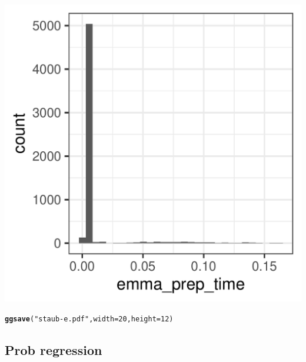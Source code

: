 \documentclass{article}\usepackage[]{graphicx}\usepackage[]{color}
\makeatletter
\def\maxwidth{ %
  \ifdim\Gin@nat@width>\linewidth
    \linewidth
  \else
    \Gin@nat@width
  \fi
}
\newcommand{\hlnum}[1]{\textcolor[rgb]{0.686,0.059,0.569}{#1}}%
\newcommand{\hlstr}[1]{\textcolor[rgb]{0.192,0.494,0.8}{#1}}%
\newcommand{\hlstd}[1]{\textcolor[rgb]{0.345,0.345,0.345}{#1}}%
\newcommand{\hlkwc}[1]{\textcolor[rgb]{0.333,0.667,0.333}{#1}}%
\newcommand{\hlkwd}[1]{\textcolor[rgb]{0.737,0.353,0.396}{\textbf{#1}}}%
\newenvironment{kframe}{%
 \def\at@end@of@kframe{}%
 \ifinner\ifhmode%
  \def\at@end@of@kframe{\end{minipage}}%
  \begin{minipage}{\columnwidth}%
 \fi\fi%
 \def\FrameCommand##1{\hskip\@totalleftmargin \hskip-\fboxsep
 \colorbox{shadecolor}{##1}\hskip-\fboxsep
     \hskip-\linewidth \hskip-\@totalleftmargin \hskip\columnwidth}%
 \MakeFramed {\advance\hsize-\width
   \@totalleftmargin\z@ \linewidth\hsize
   \@setminipage}}%
 {\par\unskip\endMakeFramed%
 \at@end@of@kframe}
\newenvironment{knitrout}{}{} %
\makeatother
\begin{document}
\begin{knitrout}
\begin{kframe}
{\ttfamily\noindent\itshape\color{messagecolor}{\#\# `stat\_bin()` using `bins = 30`. Pick better value with `binwidth`.}}\end{kframe}
\includegraphics[width=\maxwidth]{figures/figure_staub_exp3unnamed-chunk-22-1} 
\begin{kframe}\begin{alltt}
\hlkwd{ggsave}\hlstd{(}\hlstr{"staub-e.pdf"}\hlstd{,} \hlkwc{width} \hlstd{=} \hlnum{20}\hlstd{,} \hlkwc{height} \hlstd{=} \hlnum{12}\hlstd{)}
\end{alltt}


{\ttfamily\noindent\itshape\color{messagecolor}{\#\# `stat\_bin()` using `bins = 30`. Pick better value with `binwidth`.}}\end{kframe}
\end{knitrout}

\subsection{Prob regression}
\end{document}

